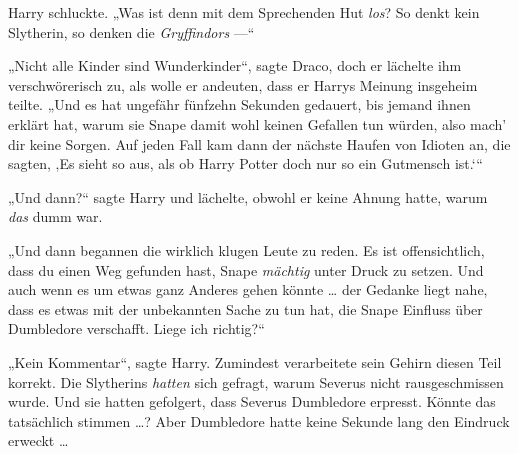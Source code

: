Harry schluckte.
„Was ist denn mit dem Sprechenden Hut \emph{los}? So denkt kein Slytherin, so denken die \emph{Gryffindors} —“

„Nicht alle Kinder sind Wunderkinder“, sagte Draco, doch er lächelte ihm verschwörerisch zu, als wolle er andeuten, dass er Harrys Meinung insgeheim teilte.
„Und es hat ungefähr fünfzehn Sekunden gedauert, bis jemand ihnen erklärt hat, warum sie Snape damit wohl keinen Gefallen tun würden, also mach’ dir keine Sorgen. Auf jeden Fall kam dann der nächste Haufen von Idioten an, die sagten, ‚Es sieht so aus, als ob Harry Potter doch nur so ein Gutmensch ist.‘“

„Und dann?“ sagte Harry und lächelte, obwohl er keine Ahnung hatte, warum \emph{das} dumm war.

„Und dann begannen die wirklich klugen Leute zu reden. Es ist offensichtlich, dass du einen Weg gefunden hast, Snape \emph{mächtig} unter Druck zu setzen. Und auch wenn es um etwas ganz Anderes gehen könnte … der Gedanke liegt nahe, dass es etwas mit der unbekannten Sache zu tun hat, die Snape Einfluss über Dumbledore verschafft. Liege ich richtig?“

„Kein Kommentar“, sagte Harry. Zumindest verarbeitete sein Gehirn diesen Teil korrekt. Die Slytherins \emph{hatten} sich gefragt, warum Severus nicht rausgeschmissen wurde. Und sie hatten gefolgert, dass Severus Dumbledore erpresst. Könnte das tatsächlich stimmen …? Aber Dumbledore hatte keine Sekunde lang den Eindruck erweckt …

